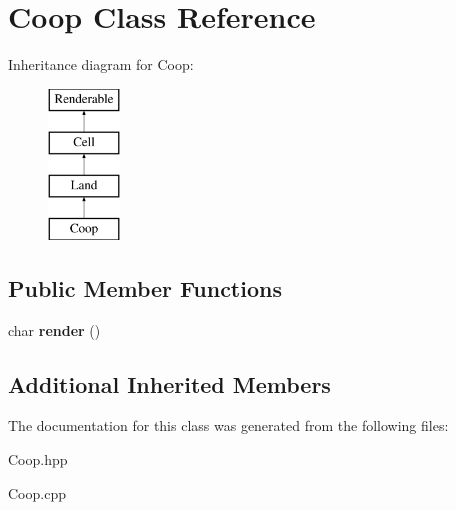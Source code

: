 \hypertarget{class_coop}{}\section{Coop Class Reference}
\label{class_coop}
Inheritance diagram for Coop\+:\begin{figure}[H]
\begin{center}
\leavevmode
\includegraphics[height=4.000000cm]{class_coop}
\end{center}
\end{figure}
\subsection*{Public Member Functions}
\begin{DoxyCompactItemize}
\item 
\mbox{\label{class_coop_aa78d597b854b8f711472de5e0249bf78}} 
char {\bfseries render} ()
\end{DoxyCompactItemize}
\subsection*{Additional Inherited Members}


The documentation for this class was generated from the following files\+:\begin{DoxyCompactItemize}
\item 
Coop.\+hpp\item 
Coop.\+cpp\end{DoxyCompactItemize}
